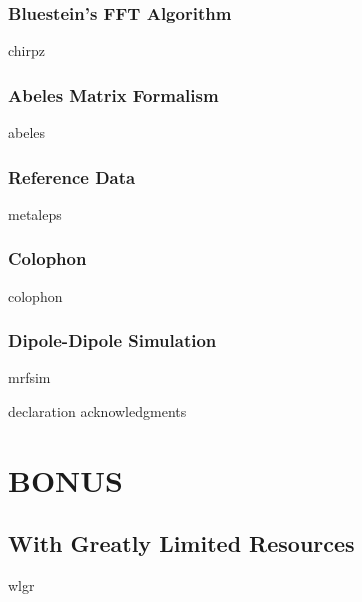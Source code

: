 \documentclass[12pt,a4paper,titlepage,onecolumn]{report}
\begin{document}
\section{Bluestein's FFT Algorithm}
{chirpz}
\section{Abeles Matrix Formalism}\label{ch:abeles}
{abeles}
\section{Reference Data}\label{ch:reference}
{metaleps}
\section{Colophon}
{colophon}
\section{Dipole-Dipole Simulation}\label{sec:mrfsim}
{mrfsim}




{declaration}
{acknowledgments}

\part{BONUS}\label{part:bonus}
\chapter{With Greatly Limited Resources}\label{ch:wlgr}
{wlgr}
\end{document}
